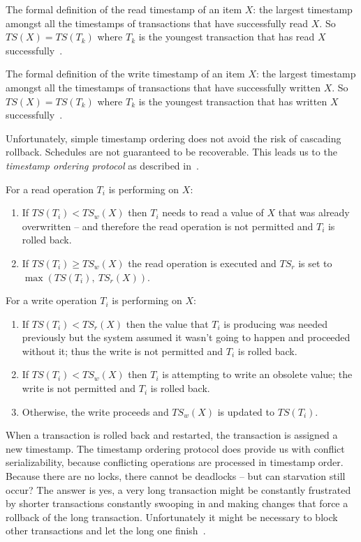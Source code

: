 The formal definition of the read timestamp of an item $X$: the largest timestamp amongst all the timestamps of transactions that have successfully read $X$. So $T\!S(X) = T\!S(T_{k})$ where $T_{k}$ is the youngest transaction that has read $X$ successfully~\cite{fds}.

The formal definition of the write timestamp of an item $X$: the largest timestamp amongst all the timestamps of transactions that have successfully written $X$. So $T\!S(X) = T\!S(T_{k})$ where $T_{k}$ is the youngest transaction that has written $X$ successfully~\cite{fds}.

Unfortunately, simple timestamp ordering does not avoid the risk of cascading rollback. Schedules are not guaranteed to be recoverable. This leads us to the \textit{timestamp ordering protocol} as described in~\cite{dsc}.

For a read operation $T_{i}$ is performing on $X$:
\begin{enumerate}
	\item If $T\!S(T_{i}) < T\!S_{w}(X)$ then $T_{i}$ needs to read a value of $X$ that was already overwritten -- and therefore the read operation is not permitted and $T_{i}$ is rolled back.
	\item If $T\!S(T_{i}) \geq T\!S_{w}(X)$ the read operation is executed and $T\!S_{r}$ is set to $\max ( T\!S(T_{i}),~T\!S_{r}(X))$.
\end{enumerate}

For a write operation $T_{i}$ is performing on $X$:
\begin{enumerate}

\item If $T\!S(T_{i}) < T\!S_{r}(X)$ then the value that $T_{i}$ is producing was needed previously but the system assumed it wasn't going to happen and proceeded without it; thus the write is not permitted and $T_{i}$ is rolled back.
\item If $T\!S(T_{i}) < T\!S_{w}(X)$ then $T_{i}$ is attempting to write an obsolete value; the write is not permitted and $T_{i}$ is rolled back.
\item Otherwise, the write proceeds and $T\!S_{w}(X)$ is updated to $T\!S(T_{i})$. 

\end{enumerate}

When a transaction is rolled back and restarted, the transaction is assigned a new timestamp. The timestamp ordering protocol does provide us with conflict serializability, because conflicting operations are processed in timestamp order. Because there are no locks, there cannot be deadlocks -- but can starvation still occur? The answer is yes, a very long transaction might be constantly frustrated by shorter transactions constantly swooping in and making changes that force a rollback of the long transaction. Unfortunately it might be necessary to block other transactions and let the long one finish~\cite{dsc}.

